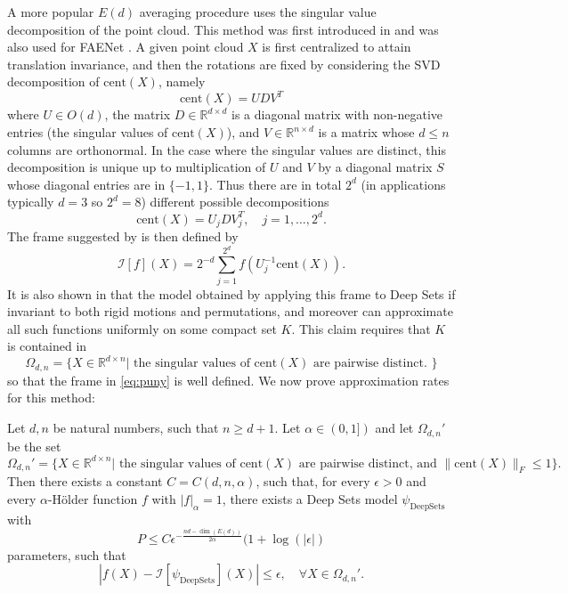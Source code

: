 \documentclass[twoside,11pt]{article}
\newcommand{\RR}{\mathbb{R}}
\newcommand{\cent}{\mathrm{cent}}
\begin{document}
A more popular $E(d)$ averaging procedure uses the singular value decomposition of the point cloud. This method was first introduced in \cite{punyframe} and was also used for FAENet \cite{faenet}. A given point cloud $X$ is first centralized to attain translation invariance, and then the rotations are fixed by considering the SVD decomposition of $\cent(X)$, namely 
\begin{equation*}
	\cent(X)=UDV^T 
	\end{equation*}
where $U\in O(d) $, the matrix $D\in \RR^{d\times d}$ is a diagonal matrix with non-negative entries (the singular values of $\cent(X)$), and $V\in \RR^{n\times d} $ is a matrix whose $d\leq n$ columns are orthonormal. In the case where the singular values  are distinct, this decomposition is unique up to multiplication of $U$ and $V$ by a diagonal matrix $S $ whose diagonal entries are in $\{-1,1\}$. Thus there are in total $2^d$ (in applications typically $d=3$ so $2^d=8$) different possible decompositions 
\begin{equation}\label{eq:svd}
\cent(X)=U_jDV_j^T, \quad j=1,\ldots,2^d .
\end{equation}
The frame suggested by \cite{punyframe} is then defined by 
\begin{equation}\label{eq:puny}
\mathcal{I}[f](X)=2^{-d}\sum_{j=1}^{2^d} f(U_j^{-1}\cent(X)). \end{equation}
It is also shown in \cite{punyframe} that the model obtained by applying this frame to Deep Sets if invariant to both rigid motions and permutations, and moreover can approximate all such functions uniformly on some compact set $K$. This claim  requires that $K$ is contained in 
$$\Omega_{d,n}=\{X\in \RR^{d\times n}| \text{ the singular values of } \cent(X) \text{ are pairwise distinct. }\} $$
so that the frame in \eqref{eq:puny} is well defined. We now prove approximation rates for this method:
\begin{prop}
Let $d,n$ be natural numbers, such that $n\geq d+1 $. Let $\alpha \in (0,1])$ and let $\Omega_{d,n}' $ be the set 
$$\Omega_{d,n}'=\{ X\in \RR^{d\times n}| \text{ the singular values of } \cent(X) \text{ are pairwise distinct, and } \|\cent(X)\|_F\leq 1  \} .$$
 Then there exists a constant $C=C(d,n,\alpha) $, such that, for every $\epsilon>0$ and every $\alpha$-H\"older function $f$ with $|f|_\alpha=1 $, there exists a Deep Sets model $\psi_{\mathrm{Deep Sets}} $ with 
 $$P\leq C\epsilon^{-\frac{nd-\dim(E(d))}{2\alpha}}(1+\log(|\epsilon|) $$
parameters, such that 
$$|f(X)-\mathcal{I}[\psi_{\mathrm{Deep Sets}} ](X)|\leq \epsilon, \quad \forall X\in \Omega_{d,n}'.$$ 
\end{prop}
\end{document}
